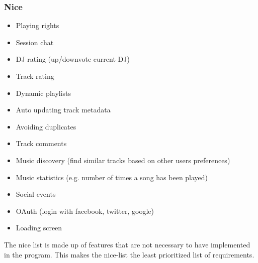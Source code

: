\subsubsection{Nice}


\begin{itemize}
	\item Playing rights 
	\item Session chat
	\item DJ rating (up/downvote current DJ)
	\item Track rating
	\item Dynamic playlists
	\item Auto updating track metadata
	\item Avoiding duplicates
	\item Track comments
	\item Music discovery (find similar tracks based on other users preferences)
	\item Music statistics (e.g. number of times a song has been played) 
	\item Social events
	\item OAuth (login with facebook, twitter, google)
	\item Loading screen
\end{itemize}


The nice list is made up of features that are not necessary to have implemented in the
program. This makes the nice-list the least prioritized list of requirements.